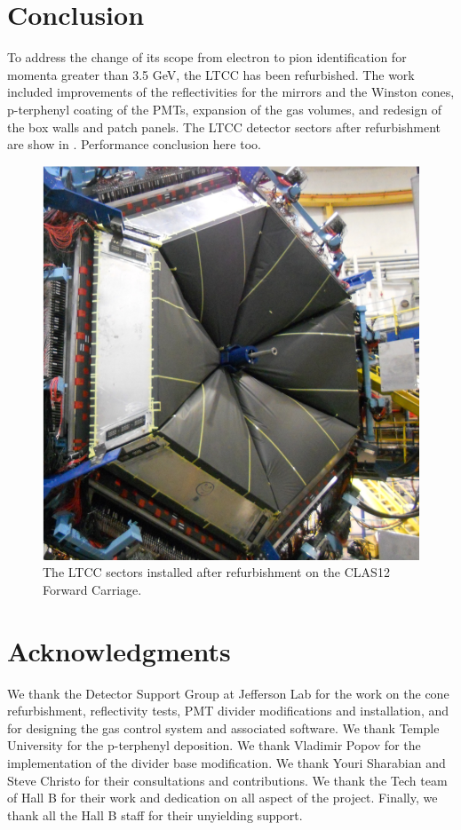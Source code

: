 \section{Conclusion}

To address the change of its scope from electron to pion identification for momenta
greater than 3.5 GeV, the LTCC has been refurbished. The work included improvements of the
reflectivities for the mirrors and the Winston cones, p-terphenyl
coating of the PMTs, expansion of the gas volumes, and redesign of the box walls and patch panels.
The LTCC detector sectors after refurbishment are show in .
Performance conclusion here too.

\begin{figure}
	\centering
	\includegraphics[width=1.0\columnwidth,keepaspectratio]{img/ltccInstalled.png}
	\caption{The LTCC sectors installed after refurbishment on the CLAS12 Forward Carriage.}
	\label{fig:ltccInstalled}
\end{figure}


\section{Acknowledgments}

We thank the Detector Support Group at Jefferson Lab for the work on the cone refurbishment, reflectivity tests,
PMT divider modifications and installation, and for designing the gas control system and associated software.
We thank Temple University for the p-terphenyl deposition. We thank Vladimir Popov for the implementation
of the divider base modification. We thank Youri Sharabian and Steve Christo for their consultations and contributions.
We thank the Tech team of Hall B for their work and dedication on all aspect of the project.
Finally, we thank all the Hall B staff for their unyielding support.

